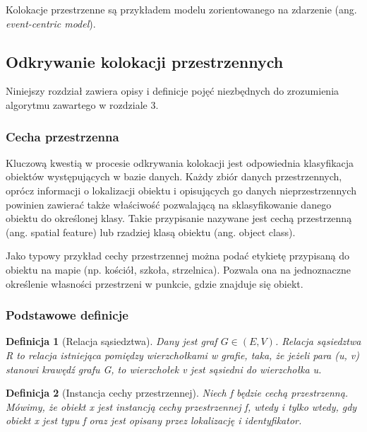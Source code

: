 \documentclass[12pt]{article}
\newtheorem{defin}{Definicja}
\begin{document}
Kolokacje przestrzenne są przykładem modelu zorientowanego na zdarzenie (ang. \textit{event-centric model}).

\subsection{Odkrywanie kolokacji przestrzennych}

Niniejszy rozdział zawiera opisy i definicje pojęć niezbędnych do zrozumienia algorytmu zawartego w rozdziale 3.

\subsubsection{Cecha przestrzenna}

Kluczową kwestią w procesie odkrywania kolokacji jest odpowiednia klasyfikacja obiektów występujących w bazie danych. Każdy zbiór danych przestrzennych, oprócz informacji o lokalizacji obiektu i opisujących go danych nieprzestrzennych powinien zawierać także właściwość pozwalającą na sklasyfikowanie danego obiektu do określonej klasy. Takie przypisanie nazywane jest cechą przestrzenną (ang. spatial feature) lub rzadziej klasą obiektu (ang. object class).

Jako typowy przykład cechy przestrzennej można podać etykietę przypisaną do obiektu na mapie (np. kościół, szkoła, strzelnica). Pozwala ona na jednoznaczne określenie własności przestrzeni w punkcie, gdzie znajduje się obiekt.

\subsubsection{Podstawowe definicje}

\begin{defin}[Relacja sąsiedztwa]
Dany jest graf $ G \in (E, V) $. Relacja sąsiedztwa R to relacja istniejąca pomiędzy wierzchołkami w grafie, taka, że jeżeli para (u, v) stanowi krawędź grafu G, to wierzchołek v jest sąsiedni do wierzchołka u. 
\end{defin}

\begin{defin}[Instancja cechy przestrzennej]
Niech f będzie cechą przestrzenną. Mówimy, że obiekt x jest instancją cechy przestrzennej f, wtedy i tylko wtedy, gdy obiekt x jest typu f oraz jest opisany przez lokalizację i identyfikator.
\end{defin}
\end{document}
